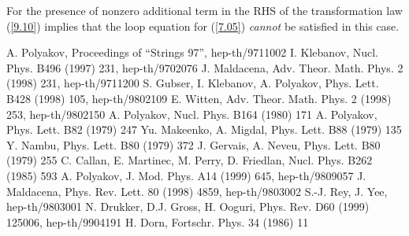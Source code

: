 \documentclass[a4paper,12pt]{article}
\numberwithin{equation}{section}
\begin{document}
For \coordHE{} the presence of nonzero additional term in the RHS of the
transformation law (\ref{9.10}) implies that the loop equation for (\ref{7.05})
\emph{cannot} be satisfied in this case.

\begin{thebibliography}{10}
A. Polyakov, Proceedings of ``Strings 97'', hep-th/9711002
I. Klebanov, Nucl. Phys. B496 (1997) 231, hep-th/9702076
J. Maldacena, Adv. Theor. Math. Phys. 2 (1998) 231, hep-th/9711200
S. Gubser, I. Klebanov, A. Polyakov, Phys. Lett. B428 (1998) 105, hep-th/9802109
E. Witten, Adv. Theor. Math. Phys. 2 (1998) 253, hep-th/9802150
A. Polyakov, Nucl. Phys. B164 (1980) 171
A. Polyakov, Phys. Lett. B82 (1979) 247
Yu. Makeenko, A. Migdal, Phys. Lett. B88 (1979) 135
Y. Nambu, Phys. Lett. B80 (1979) 372
J. Gervais, A. Neveu, Phys. Lett. B80 (1979) 255
C. Callan, E. Martinec, M. Perry, D. Friedlan, Nucl. Phys. B262 (1985) 593
A. Polyakov, J. Mod. Phys. A14 (1999) 645, hep-th/9809057
J. Maldacena, Phys. Rev. Lett. 80 (1998) 4859, hep-th/9803002
S.-J. Rey, J. Yee, hep-th/9803001
N. Drukker, D.J. Gross, H. Ooguri, Phys. Rev. D60 (1999) 125006, hep-th/9904191
H. Dorn, Fortschr. Phys. 34 (1986) 11
\end{thebibliography}
\end{document}

